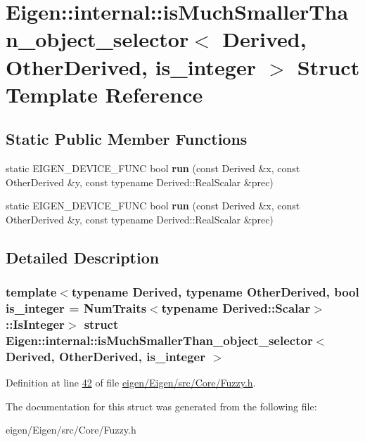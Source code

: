 \hypertarget{struct_eigen_1_1internal_1_1is_much_smaller_than__object__selector}{}\section{Eigen\+:\+:internal\+:\+:is\+Much\+Smaller\+Than\+\_\+object\+\_\+selector$<$ Derived, Other\+Derived, is\+\_\+integer $>$ Struct Template Reference}
\label{struct_eigen_1_1internal_1_1is_much_smaller_than__object__selector}
\subsection*{Static Public Member Functions}
\begin{DoxyCompactItemize}
\item 
\mbox{\label{struct_eigen_1_1internal_1_1is_much_smaller_than__object__selector_a4055eacfe65dad75de1e5cf0740fe7c1}} 
static E\+I\+G\+E\+N\+\_\+\+D\+E\+V\+I\+C\+E\+\_\+\+F\+U\+NC bool {\bfseries run} (const Derived \&x, const Other\+Derived \&y, const typename Derived\+::\+Real\+Scalar \&prec)
\item 
\mbox{\label{struct_eigen_1_1internal_1_1is_much_smaller_than__object__selector_a4055eacfe65dad75de1e5cf0740fe7c1}} 
static E\+I\+G\+E\+N\+\_\+\+D\+E\+V\+I\+C\+E\+\_\+\+F\+U\+NC bool {\bfseries run} (const Derived \&x, const Other\+Derived \&y, const typename Derived\+::\+Real\+Scalar \&prec)
\end{DoxyCompactItemize}


\subsection{Detailed Description}
\subsubsection*{template$<$typename Derived, typename Other\+Derived, bool is\+\_\+integer = Num\+Traits$<$typename Derived\+::\+Scalar$>$\+::\+Is\+Integer$>$\newline
struct Eigen\+::internal\+::is\+Much\+Smaller\+Than\+\_\+object\+\_\+selector$<$ Derived, Other\+Derived, is\+\_\+integer $>$}



Definition at line \hyperlink{eigen_2_eigen_2src_2_core_2_fuzzy_8h_source_l00042}{42} of file \hyperlink{eigen_2_eigen_2src_2_core_2_fuzzy_8h_source}{eigen/\+Eigen/src/\+Core/\+Fuzzy.\+h}.



The documentation for this struct was generated from the following file\+:\begin{DoxyCompactItemize}
\item 
eigen/\+Eigen/src/\+Core/\+Fuzzy.\+h\end{DoxyCompactItemize}

